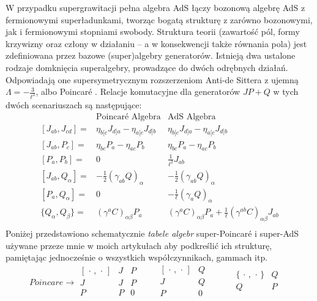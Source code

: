 \documentclass[12pt,a4paper]{article}
\begin{document}
W przypadku supergrawitacji pełna algebra AdS łączy bozonową algebrę AdS z fermionowymi superładunkami, tworząc bogatą strukturę z zarówno bozonowymi, jak i fermionowymi stopniami swobody. Struktura teorii (zawartość pól, formy krzywizny oraz człony w działaniu – a w konsekwencji także równania pola) jest zdefiniowana przez bazowe (super)algebry generatorów. Istnieją dwa ustalone rodzaje domknięcia superalgebry, prowadzące do dwóch odrębnych działań. Odpowiadają one supersymetrycznym rozszerzeniom Anti-de Sittera z ujemną $\Lambda=-\frac{3}{\ell^2}$, albo Poincaré \cite{Hassaine:2016amq}. Relacje komutacyjne dla generatorów $JP+Q$ w tych dwóch scenariuszach są następujące:
\begin{equation}
	\begin{array}{c|c|c}
		~~ & \text{Poincar\'e Algebra} & \text{AdS Algebra} \\
		\hline
		[J_{ab}, J_{cd}]= & \eta_{b[c} J_{d]a} - \eta_{a[c} J_{d]b} & \eta_{b[c} J_{d]a} - \eta_{a[c} J_{d]b}\\		
		\hline
		[J_{ab}, P_c]= & \eta_{bc} P_a - \eta_{ac} P_b & \eta_{bc} P_a - \eta_{ac} P_b \\
		\hline
		[P_a, P_b]= & 0 & \frac{1}{\ell^2} J_{ab} \\
		\hline
		[J_{ab}, Q_\alpha]= & -\frac{1}{2} (\gamma_{ab} Q)_\alpha & -\frac{1}{2} (\gamma_{ab} Q)_\alpha \\
		\hline
		[P_a, Q_\alpha]= & 0 & -\frac{1}{\ell} (\gamma_a Q)_\alpha \\
		\hline
		\{Q_\alpha, Q_\beta\}= & (\gamma^a C)_{\alpha\beta} P_a & (\gamma^a C)_{\alpha\beta} P_a + \frac{1}{\ell} (\gamma^{ab} C)_{\alpha\beta} J_{ab} \\
	\end{array}
\end{equation}
Poniżej przedstawiono schematycznie \textit{tabele algebr} super-Poincar\'e i super-AdS używane przeze mnie w moich artykułach aby podkreślić ich strukturę, pamiętając jednocześnie o wszystkich współczynnikach, gammach itp.
\begin{equation}\label{table_Poincare}
	Poincare\to
	\begin{array}{c|cc}
		[\,\cdot\,,\,\cdot\,] & J & P \\
		\hline
		J & J & P \\
		P & P & 0 \\
	\end{array}
	\qquad
	\begin{array}{c|cc}
		[\,\cdot\,,\,\cdot\,] & Q & \\
		\hline
		J & Q & \\
		P & 0 & \\
	\end{array}
	\qquad
	\begin{array}{c|c}
		\{\,\cdot\,,\,\cdot\,\} & Q \\
		\hline
		Q & P \\
	\end{array}\quad
\end{equation}
\end{document}
